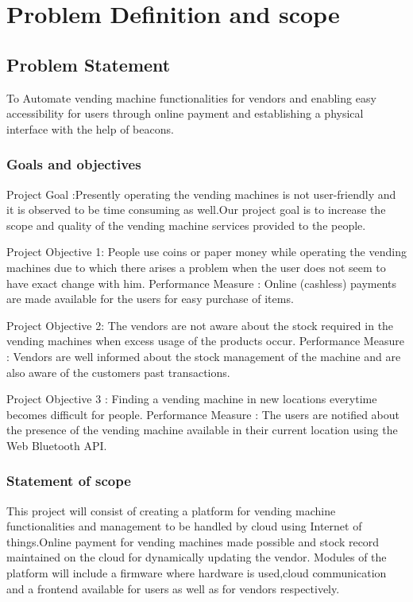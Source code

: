 \documentclass[oneside,a4paper,12pt]{report}
\begin{document}
\chapter{Problem Definition and scope}
\section{Problem Statement}
 To Automate vending machine functionalities for vendors and enabling easy accessibility for users through online payment and establishing a physical interface with the help of beacons. 


\subsection{Goals and objectives}  
Project Goal :Presently operating the vending machines is not user-friendly and it is observed to be time consuming as well.Our project goal is to increase the scope and quality of the vending machine services provided to the people. 

Project Objective 1:
People use coins or paper money while operating the vending machines due to which there arises a problem when the user does not seem to have exact change with him.
Performance Measure :
Online (cashless) payments are made available for the users for easy purchase of items.

Project Objective 2:
The vendors are not aware about the stock required in the vending machines when excess usage of the products occur.
Performance Measure :
Vendors are well informed about the stock management of the machine and are also aware of the customers past transactions.

Project Objective 3 :
Finding a vending machine in new locations everytime becomes difficult for people.
Performance Measure :
The users are notified about the presence of the vending machine available in their current location using the Web Bluetooth API.
	
 \subsection{Statement of scope} 
This project will consist of creating a platform for vending machine functionalities and management to be  handled by cloud using Internet of things.Online payment for vending machines made possible and stock record maintained on the cloud for dynamically updating the vendor. Modules of the platform will include a firmware where hardware is used,cloud communication and a frontend available for users as well as for vendors respectively.
\end{document}

